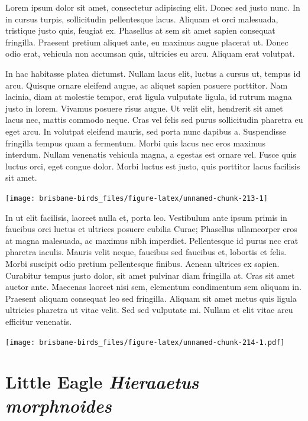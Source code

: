 \documentclass[]{book}
\let\origfigure\figure
\let\endorigfigure\endfigure
\renewenvironment{figure}[1][2] {
  \expandafter\origfigure\expandafter[H]
} {
  \endorigfigure
}
\begin{document}
Lorem ipsum dolor sit amet, consectetur adipiscing elit. Donec sed justo
nunc. In in cursus turpis, sollicitudin pellentesque lacus. Aliquam et
orci malesuada, tristique justo quis, feugiat ex. Phasellus at sem sit
amet sapien consequat fringilla. Praesent pretium aliquet ante, eu
maximus augue placerat ut. Donec odio erat, vehicula non accumsan quis,
ultricies eu arcu. Aliquam erat volutpat.

In hac habitasse platea dictumst. Nullam lacus elit, luctus a cursus ut,
tempus id arcu. Quisque ornare eleifend augue, ac aliquet sapien posuere
porttitor. Nam lacinia, diam at molestie tempor, erat ligula vulputate
ligula, id rutrum magna justo in lorem. Vivamus posuere risus augue. Ut
velit elit, hendrerit sit amet lacus nec, mattis commodo neque. Cras vel
felis sed purus sollicitudin pharetra eu eget arcu. In volutpat eleifend
mauris, sed porta nunc dapibus a. Suspendisse fringilla tempus quam a
fermentum. Morbi quis lacus nec eros maximus interdum. Nullam venenatis
vehicula magna, a egestas est ornare vel. Fusce quis luctus orci, eget
congue dolor. Morbi luctus est justo, quis porttitor lacus facilisis sit
amet.

\begin{figure}
\texttt{[image: brisbane-birds\_files/figure-latex/unnamed-chunk-213-1]} \caption{insert figure caption}\label{fig:unnamed-chunk-213}
\end{figure}

In ut elit facilisis, laoreet nulla et, porta leo. Vestibulum ante ipsum
primis in faucibus orci luctus et ultrices posuere cubilia Curae;
Phasellus ullamcorper eros at magna malesuada, ac maximus nibh
imperdiet. Pellentesque id purus nec erat pharetra iaculis. Mauris velit
neque, faucibus sed faucibus et, lobortis et felis. Morbi suscipit odio
pretium pellentesque finibus. Aenean ultrices ex sapien. Curabitur
tempus justo dolor, sit amet pulvinar diam fringilla at. Cras sit amet
auctor ante. Maecenas laoreet nisi sem, elementum condimentum sem
aliquam in. Praesent aliquam consequat leo sed fringilla. Aliquam sit
amet metus quis ligula ultricies pharetra ut vitae velit. Sed sed
vulputate mi. Nullam et elit vitae arcu efficitur venenatis.

\begin{figure}
\centering
\texttt{[image: brisbane-birds\_files/figure-latex/unnamed-chunk-214-1.pdf]}
\caption{\label{fig:unnamed-chunk-214}insert figure caption}
\end{figure}

\section{\texorpdfstring{Little Eagle \emph{Hieraaetus
morphnoides}}{Little Eagle Hieraaetus morphnoides}}\label{little-eagle-hieraaetus-morphnoides}
\end{document}
